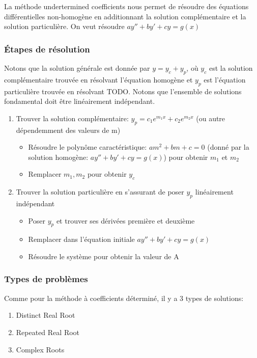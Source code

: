 \documentclass{article}
\begin{document}
La méthode undertermined coefficients nous permet de résoudre des équations
différentielles non-homogène en additionnant la solution complémentaire et
la solution particulière. On veut résoudre $ ay''+by'+cy=g(x)$

\subsubsection{Étapes de résolution}%
\label{ssub:Étapes de résolution}

Notons que la solution générale est donnée par $ y= y_c + y_p$, où $y_c$ est
la solution complémentaire trouvée en résolvant l'équation homogène et
$y_p$ est l'équation particulière trouvée en résolvant TODO. Notons que
l'ensemble de solutions fondamental doit être linéairement indépendant.

\begin{enumerate}
    \item Trouver la solution complémentaire: $y_p = c_1 e^{m_1 x} + c_2 e^{m_2 x}$ (ou autre dépendemment des valeurs de m)
	\begin{itemize}
	    \item Résoudre le polynôme caractéristique: $ am^2+bm+c=0$
		(donné par la solution homogène: $ ay''+by'+cy=g(x)$)
		pour obtenir $m_1$ et $m_2$
	    \item Remplacer $m_1, m_2$ pour obtenir $y_c$
	\end{itemize}
    \item Trouver la solution particulière en s'assurant de poser $y_p$
	linéairement indépendant
	\begin{itemize}
	    \item Poser $y_p$ et trouver ses dérivées première et deuxième
	    \item Remplacer dans l'équation initiale $ ay''+by'+cy=g(x)$
	    \item Résoudre le système pour obtenir la valeur de A
	\end{itemize}
\end{enumerate}

\subsubsection{Types de problèmes}%
\label{ssub:Types de problèmes}

Comme pour la méthode à coefficients déterminé, il y a 3 types de solutions:
\begin{enumerate}
    \item Distinct Real Root
    \item Repeated Real Root
    \item Complex Roots
\end{enumerate}
\end{document}
